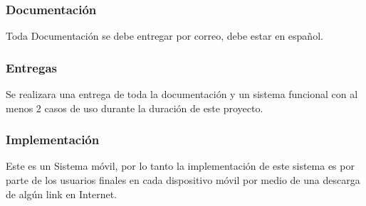 \documentclass[12pt]{article}
\begin{document}
\subsubsection{Documentaci\'on}
Toda Documentaci\'on se debe entregar por correo, debe estar en espa\~nol.

\subsubsection{Entregas}
Se realizara una entrega de toda la documentaci\'on y un sistema funcional con al menos 2 casos de uso durante la duraci\'on de este proyecto.

\subsubsection{Implementaci\'on}
Este es un Sistema m\'ovil, por lo tanto la implementaci\'on de este sistema es por parte de los usuarios finales en cada dispositivo m\'ovil por medio de una descarga de alg\'un link en Internet.


\newpage
\end{document}
